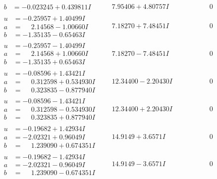 \documentclass[1p]{elsarticle_modified}
\theoremstyle{definition}
\begin{document}
$$\begin{array}{c|c|c}
\begin{aligned}
b &= -0.023245 + 0.439811 I\end{aligned}
 & \phantom{-}7.95406 + 4.80757 I & \phantom{-0.000000 } 0 \\ \hline\begin{aligned}
u &= -0.25957 + 1.40499 I \\
a &= \phantom{-}2.14568 - 1.00660 I \\
b &= -1.35135 - 0.65463 I\end{aligned}
 & \phantom{-}7.18270 + 7.48451 I & \phantom{-0.000000 } 0 \\ \hline\begin{aligned}
u &= -0.25957 - 1.40499 I \\
a &= \phantom{-}2.14568 + 1.00660 I \\
b &= -1.35135 + 0.65463 I\end{aligned}
 & \phantom{-}7.18270 - 7.48451 I & \phantom{-0.000000 } 0 \\ \hline\begin{aligned}
u &= -0.08596 + 1.43421 I \\
a &= \phantom{-}0.312598 + 0.534930 I \\
b &= \phantom{-}0.323835 - 0.877940 I\end{aligned}
 & \phantom{-}12.34400 - 2.20430 I & \phantom{-0.000000 } 0 \\ \hline\begin{aligned}
u &= -0.08596 - 1.43421 I \\
a &= \phantom{-}0.312598 - 0.534930 I \\
b &= \phantom{-}0.323835 + 0.877940 I\end{aligned}
 & \phantom{-}12.34400 + 2.20430 I & \phantom{-0.000000 } 0 \\ \hline\begin{aligned}
u &= -0.19682 + 1.42934 I \\
a &= -2.02321 + 0.96049 I \\
b &= \phantom{-}1.239090 + 0.674351 I\end{aligned}
 & \phantom{-}14.9149 + 3.6571 I & \phantom{-0.000000 } 0 \\ \hline\begin{aligned}
u &= -0.19682 - 1.42934 I \\
a &= -2.02321 - 0.96049 I \\
b &= \phantom{-}1.239090 - 0.674351 I\end{aligned}
 & \phantom{-}14.9149 - 3.6571 I & \phantom{-0.000000 } 0 \\ \hline\begin{aligned}

\end{aligned}
\end{array}$$
\end{document}
